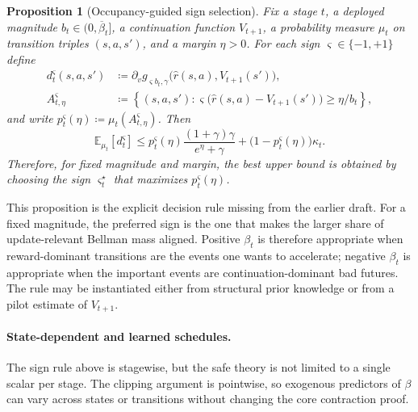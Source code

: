 \documentclass{article}
\newtheorem{proposition}[proposition]{Proposition}
\theoremstyle{remark}
\newcommand{\E}{\mathbb{E}}
\newcommand{\defeq}{\coloneqq}
\newcommand{\betacap}{\overline\beta}
\begin{document}
\begin{proposition}[Occupancy-guided sign selection]
\label{prop:sign-selection}
Fix a stage $t$, a deployed magnitude $b_t\in(0,\betacap_t]$, a continuation function $V_{t+1}$, a probability measure $\mu_t$ on transition triples $(s,a,s')$, and a margin $\eta>0$. For each sign $\varsigma\in\{-1,+1\}$ define
\[
\begin{aligned}
d_t^{\varsigma}(s,a,s')&\defeq \partial_v g_{\varsigma b_t,\gamma}\bigl(\hat r(s,a),V_{t+1}(s')\bigr),\\
A_{t,\eta}^{\varsigma}&\defeq\left\{(s,a,s'): \varsigma\bigl(\hat r(s,a)-V_{t+1}(s')\bigr)\ge \eta/b_t\right\},
\end{aligned}
\]
and write $p_t^{\varsigma}(\eta)\defeq \mu_t(A_{t,\eta}^{\varsigma})$. Then
\begin{equation}
\E_{\mu_t}[d_t^{\varsigma}]
\le
p_t^{\varsigma}(\eta)\frac{(1+\gamma)\gamma}{e^{\eta}+\gamma}
+
\bigl(1-p_t^{\varsigma}(\eta)\bigr)\kappa_t.
\label{eq:sign-selection-bound}
\end{equation}
Therefore, for fixed magnitude and margin, the best upper bound is obtained by choosing the sign $\varsigma_t^\star$ that maximizes $p_t^{\varsigma}(\eta)$.
\end{proposition}

This proposition is the explicit decision rule missing from the earlier draft. For a fixed magnitude, the preferred sign is the one that makes the larger share of update-relevant Bellman mass aligned. Positive $\beta_t$ is therefore appropriate when reward-dominant transitions are the events one wants to accelerate; negative $\beta_t$ is appropriate when the important events are continuation-dominant bad futures. The rule may be instantiated either from structural prior knowledge or from a pilot estimate of $V_{t+1}$.

\paragraph{State-dependent and learned schedules.}
The sign rule above is stagewise, but the safe theory is not limited to a single scalar per stage. The clipping argument is pointwise, so exogenous predictors of $\beta$ can vary across states or transitions without changing the core contraction proof.
\end{document}
